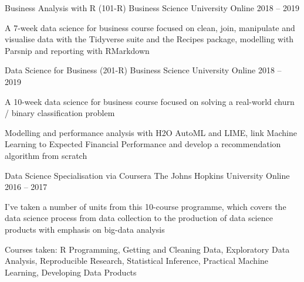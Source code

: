 

\begin{cventries}

  \cventry
    {Business Analysis with R (101-R)} %
    {Business Science University} %
    {Online} %
    {2018 – 2019} %
    {
      \begin{cvitems} %
        \item {A 7-week data science for business course focused on clean, join, manipulate and visualise data with the Tidyverse suite and the Recipes package, modelling with Parsnip and reporting with RMarkdown}
      \end{cvitems}
    }

  \cventry
    {Data Science for Business (201-R)} %
    {Business Science University} %
    {Online} %
    {2018 – 2019} %
    {
      \begin{cvitems} %
        \item {A 10-week data science for business course focused on solving a real-world churn / binary classification problem}
        \item {Modelling and performance analysis with H2O AutoML and LIME, link Machine Learning to Expected Financial Performance and develop a recommendation algorithm from scratch}
      \end{cvitems}
    }
    
  \cventry
    {Data Science Specialisation via Coursera} %
    {The Johns Hopkins University} %
    {Online} %
    {2016 – 2017} %
    {
      \begin{cvitems} %
        \item {I've taken a number of units from this 10-course programme, which covers the data science process from data collection to the production of data science products with emphasis on big-data analysis}
        \item {Courses taken: R Programming, Getting and Cleaning Data, Exploratory Data Analysis, Reproducible Research, Statistical Inference, Practical Machine Learning, Developing Data Products}
      \end{cvitems}
    }
    

\end{cventries}
